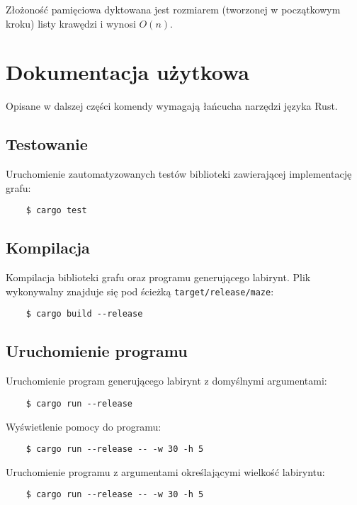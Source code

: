 \documentclass[twocolumn]{article}
\begin{document}
Złożoność pamięciowa dyktowana jest rozmiarem (tworzonej w początkowym kroku) listy krawędzi i wynosi \(O(n)\).

\section{Dokumentacja użytkowa}
Opisane w dalszej części komendy wymagają łańcucha narzędzi języka Rust.

\subsection{Testowanie}
Uruchomienie zautomatyzowanych testów biblioteki zawierającej implementację grafu:
\begin{lstlisting}
	$ cargo test
\end{lstlisting}

\subsection{Kompilacja}
Kompilacja biblioteki grafu oraz programu generującego labirynt.
Plik wykonywalny znajduje się pod ścieżką \verb|target/release/maze|:
\begin{lstlisting}
	$ cargo build --release
\end{lstlisting}

\subsection{Uruchomienie programu}
Uruchomienie program generującego labirynt z domyślnymi argumentami:
\begin{lstlisting}
	$ cargo run --release
\end{lstlisting}
Wyświetlenie pomocy do programu:
\begin{lstlisting}
	$ cargo run --release -- -w 30 -h 5
\end{lstlisting}
Uruchomienie programu z argumentami określającymi wielkość labiryntu:
\begin{lstlisting}
	$ cargo run --release -- -w 30 -h 5
\end{lstlisting}
\end{document}
